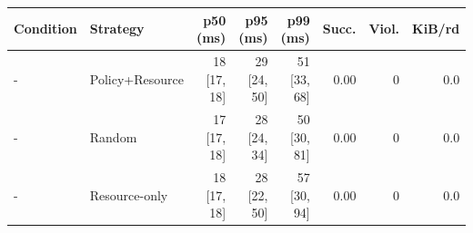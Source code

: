 \begin{tabular}{llrrrrrr}
\toprule
Condition & Strategy & p50 (ms) & p95 (ms) & p99 (ms) & Succ. & Viol. & KiB/rd \\
\midrule
- & Policy+Resource & 18 [17, 18] & 29 [24, 50] & 51 [33, 68] & 0.00 & 0 & 0.0 \\
- & Random & 17 [17, 18] & 28 [24, 34] & 50 [30, 81] & 0.00 & 0 & 0.0 \\
- & Resource-only & 18 [17, 18] & 28 [22, 50] & 57 [30, 94] & 0.00 & 0 & 0.0 \\
\bottomrule
\end{tabular}
